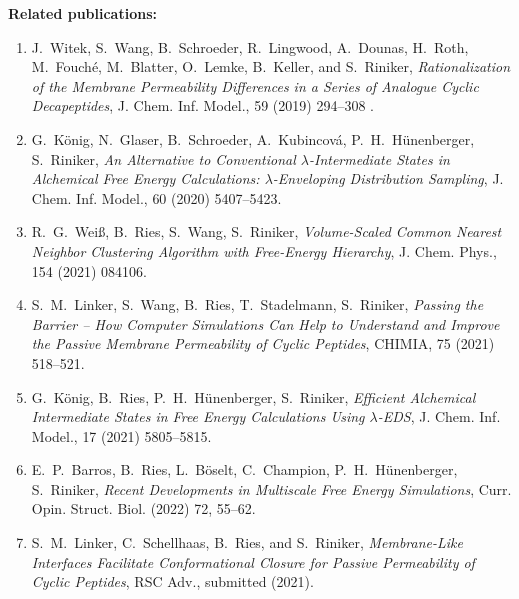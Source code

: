\newpage
\noindent \textbf{Related publications:}
\begin{enumerate}
    \item J.\ Witek, S.\ Wang, B.\ Schroeder, R.\ Lingwood, A.\ Dounas, H.\ Roth, M.\ Fouché, M.\ Blatter, O.\ Lemke, B.\ Keller, and S.\ Riniker, \textit{Rationalization of the Membrane Permeability Differences in a Series of Analogue Cyclic Decapeptides}, {J. Chem. Inf. Model.}, {59} (2019) 294--308 .
    \item  G.\ K\"onig, N.\ Glaser, B.\ Schroeder, A.\ Kubincová, P.\ H.\ H\"unenberger, S.\ Riniker, \textit{An Alternative to Conventional $\lambda$-Intermediate States in Alchemical Free Energy Calculations: $\lambda$-Enveloping Distribution Sampling}, {J. Chem. Inf. Model.}, {60} (2020) 5407--5423.
    \item R.\ G.\ Wei\ss, B.\ Ries, S.\ Wang, S.\ Riniker, \textit{Volume-Scaled Common Nearest Neighbor Clustering Algorithm with Free-Energy Hierarchy}, {J. Chem. Phys.}, {154} (2021) 084106.
    \item S.\ M.\ Linker, S.\ Wang, B.\ Ries, T.\ Stadelmann, S.\ Riniker, \textit{Passing the Barrier – How Computer Simulations Can Help to Understand and Improve the Passive Membrane Permeability of Cyclic Peptides}, {CHIMIA}, {75} (2021) 518--521.
    \item G.\ K\"onig, B.\ Ries, P.\ H.\ H\"unenberger, S.\ Riniker, \textit{Efficient Alchemical Intermediate States in Free Energy Calculations Using  $\lambda$-EDS}, {J. Chem. Inf. Model.}, {17} (2021) 5805--5815.
    \item E.\ P.\ Barros, B.\ Ries, L.\ B\"oselt, C.\ Champion, P.\ H.\ H\"unenberger, S.\ Riniker, \textit{Recent Developments in Multiscale Free Energy Simulations}, {Curr. Opin. Struct. Biol.} (2022) {72}, 55--62.
    \item S.\ M.\ Linker, C.\ Schellhaas, B.\ Ries, and S.\ Riniker,\textit{ Membrane-Like Interfaces Facilitate Conformational Closure for Passive Permeability of Cyclic Peptides}, {RSC Adv.}, submitted (2021).

    
\end{enumerate}
